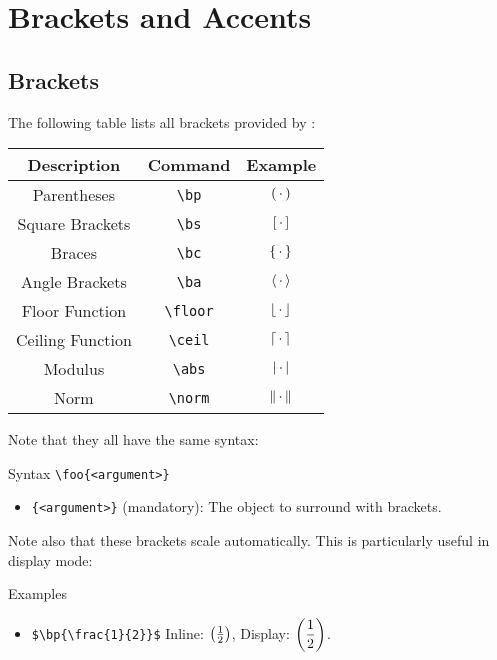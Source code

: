 \section{Brackets and Accents}

\subsection{Brackets}

The following table lists all brackets provided by \asdiasty:

\begin{table}[H]
    \centering
    \begin{tabular}{|c|c|c|}
        \hline
        \textbf{Description} & \textbf{Command} & \textbf{Example} \\ \hline \hline
        Parentheses & \verb|\bp| & $\left( \,\cdot\, \right)$ \\ \hline
        Square Brackets & \verb|\bs| & $\left[ \,\cdot\, \right]$ \\ \hline
        Braces & \verb|\bc| & $\left\lbrace \,\cdot\, \right\rbrace$ \\ \hline
        Angle Brackets & \verb|\ba| & $\left\langle \,\cdot\, \right\rangle$ \\ \hline
        Floor Function & \verb|\floor| & $\left\lfloor \,\cdot\, \right\rfloor$ \\ \hline
        Ceiling Function & \verb|\ceil| & $\left\lceil \,\cdot\, \right\rceil$ \\ \hline
        Modulus & \verb|\abs| & $\left\lvert \,\cdot\, \right\rvert$ \\ \hline
        Norm & \verb|\norm| & $\left\lVert \,\cdot\, \right\rVert$ \\ \hline
    \end{tabular}
\end{table}

Note that they all have the same syntax:

\begin{myframe}{Syntax}
    \verb|\foo{<argument>}|
    \begin{itemize}
        \item \verb|{<argument>}| (mandatory): The object to surround with brackets.
    \end{itemize}
\end{myframe}

Note also that these brackets scale automatically. This is particularly useful in display mode:

\begin{myframe}{Examples}
    \begin{itemize}
        \item \verb|$\bp{\frac{1}{2}}$| \produces{} Inline: $\left( \frac{1}{2} \right)$, Display: $\displaystyle\left( \frac{1}{2} \right)$.
    \end{itemize}
\end{myframe}

